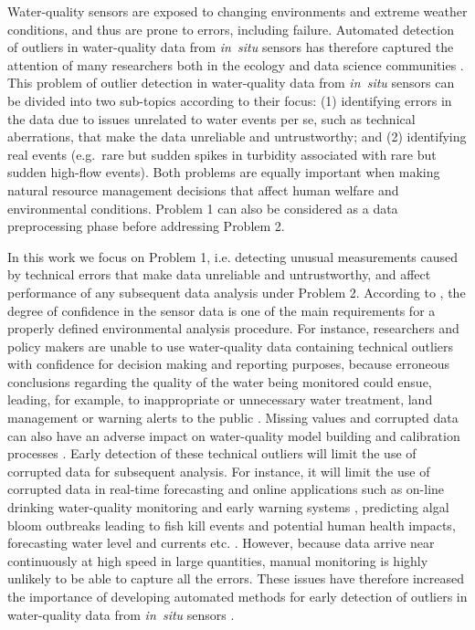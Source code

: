 \documentclass[draft]{agujournal2018} %
\begin{document}
Water-quality sensors are exposed to changing environments and extreme
weather conditions, and thus are prone to errors, including failure.
Automated detection of outliers in water-quality data from
\emph{in~situ} sensors has therefore captured the attention of many
researchers both in the ecology and data science communities
\citep{hill2009real,archer2003fault, raciti2012anomaly, mckenna2007event, koch2010distributed}. This problem of outlier detection in water-quality
data from \emph{in~situ} sensors can be divided into two sub-topics
according to their focus: (1) identifying errors in the
data due to issues unrelated to water events per se, such as technical
aberrations, that make the data unreliable and untrustworthy; and (2)
identifying real events (e.g.~rare but sudden spikes in turbidity
associated with rare but sudden high-flow events). Both problems are
equally important when making natural resource management decisions that
affect human welfare and environmental conditions. Problem 1 can also be
considered as a data preprocessing phase before addressing Problem 2.

In this work we focus on Problem 1, i.e. detecting unusual
measurements caused by technical errors that make data unreliable
and untrustworthy, and affect performance of any subsequent data
analysis under Problem 2. According to \citet{yu2012bayesian}, the
degree of confidence in the sensor data is one of the main requirements
for a properly defined environmental analysis procedure. For instance,
researchers and policy makers are unable to use water-quality data
containing technical outliers with confidence for decision making and
reporting purposes, because erroneous conclusions regarding the quality
of the water being monitored could ensue, leading, for example, to
inappropriate or unnecessary water treatment, land management or warning
alerts to the public
\citep{kotamaki2009wireless,rangeti2015validity}. Missing values and
corrupted data can also have an adverse impact on water-quality model
building and calibration processes \citep{archer2003fault}. Early
detection of these technical outliers will limit the use of corrupted
data for subsequent analysis. For instance, it will limit the use of
corrupted data in real-time forecasting and online applications such as
on-line drinking water-quality monitoring and early warning systems
\citep{storey2011advances}, predicting algal bloom outbreaks leading
to fish kill events and potential human health impacts, forecasting
water level and currents etc.
\citep{glasgow2004real,archer2003fault,hill2006automated}. However,
because data arrive near continuously at high speed in large quantities,
manual monitoring is highly unlikely to be able to capture all the
errors. These issues have therefore increased the importance of
developing automated methods for early detection of outliers in
water-quality data from \emph{in~situ} sensors \citep{hill2009real}.
\end{document}
